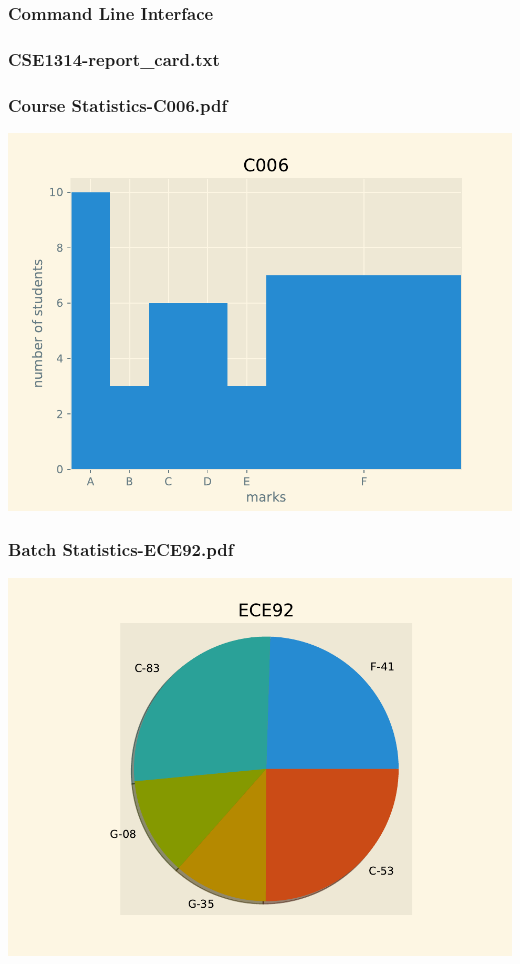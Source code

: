 \subsubsection*{Command Line Interface}
\subsubsection*{CSE1314-report\_card.txt}
\fontsize{12pt}{\baselineskip}\selectfont
{}
 \fontsize{14pt}{\baselineskip}\selectfont
\subsubsection*{Course Statistics-C006.pdf}
\includegraphics{outputs/Course Statistics-C006.pdf}
\subsubsection*{Batch Statistics-ECE92.pdf}
\includegraphics{outputs/Batch Statistics-ECE92.pdf}
